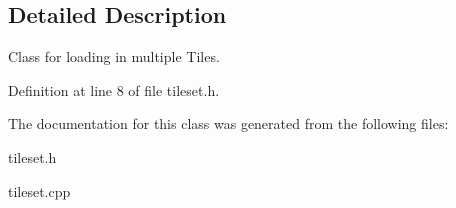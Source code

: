 \subsection{Detailed Description}
Class for loading in multiple Tiles. 

Definition at line 8 of file tileset.\+h.



The documentation for this class was generated from the following files\+:\begin{DoxyCompactItemize}
\item 
tileset.\+h\item 
tileset.\+cpp\end{DoxyCompactItemize}
